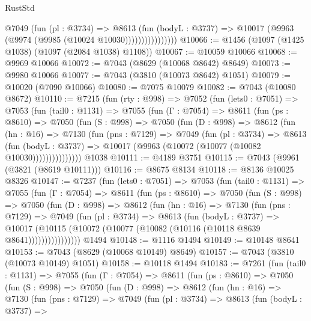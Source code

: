 \begin{lexlean}{RustStd}
\begin{coremodule}
                      @7049
                        (fun (pl : @3734) =>
                        @8613
                          (fun (bodyL : @3737) =>
                          @10017 (@9963 (@9974 (@9985 (@10024 @10030))))))))))))))))
@10066 := @1456 (@1097 (@1425 @1038) (@1097 (@2084 @1038) @1108))
@10067 := @10059 @10066
@10068 := @9969 @10066
@10072 := @7043 (@8629 (@10068 @8642) @8649)
@10073 := @9980 @10066
@10077 := @7043 (@3810 (@10073 @8642) @1051)
@10079 := @10020 (@7090 @10066)
@10080 := @7075 @10079
@10082 := @7043 (@10080 @8672)
@10110 := @7215
    (fun (rty : @998) =>
    @7052
      (fun (lets0 : @7051) =>
      @7053
        (fun (tail0 : @1131) =>
        @7055
          (fun (Γ : @7054) =>
          @8611
            (fun (ps : @8610) =>
            @7050
              (fun (S : @998) =>
              @7050
                (fun (D : @998) =>
                @8612
                  (fun (hn : @16) =>
                  @7130
                    (fun (pns : @7129) =>
                    @7049
                      (fun (pl : @3734) =>
                      @8613
                        (fun (bodyL : @3737) =>
                        @10017 (@9963 (@10072 (@10077 (@10082 @10030)))))))))))))))
    @1038
@10111 := @4189 @3751
@10115 := @7043 (@9961 (@3821 (@8619 @10111)))
@10116 := @8675 @8134
@10118 := @8136 @10025 @8326
@10147 := @7237
    (fun (lets0 : @7051) =>
    @7053
      (fun (tail0 : @1131) =>
      @7055
        (fun (Γ : @7054) =>
        @8611
          (fun (ps : @8610) =>
          @7050
            (fun (S : @998) =>
            @7050
              (fun (D : @998) =>
              @8612
                (fun (hn : @16) =>
                @7130
                  (fun (pns : @7129) =>
                  @7049
                    (fun (pl : @3734) =>
                    @8613
                      (fun (bodyL : @3737) =>
                      @10017
                        (@10115 (@10072 (@10077 (@10082 (@10116 (@10118 @8639 @8641))))))))))))))))
    @1494
@10148 := @1116 @1494
@10149 := @10148 @8641
@10153 := @7043 (@8629 (@10068 @10149) @8649)
@10157 := @7043 (@3810 (@10073 @10149) @1051)
@10158 := @10118 @1494
@10183 := @7261
    (fun (tail0 : @1131) =>
    @7055
      (fun (Γ : @7054) =>
      @8611
        (fun (ps : @8610) =>
        @7050
          (fun (S : @998) =>
          @7050
            (fun (D : @998) =>
            @8612
              (fun (hn : @16) =>
              @7130
                (fun (pns : @7129) =>
                @7049
                  (fun (pl : @3734) =>
                  @8613
                    (fun (bodyL : @3737) =>

\end{coremodule}
\end{lexlean}
